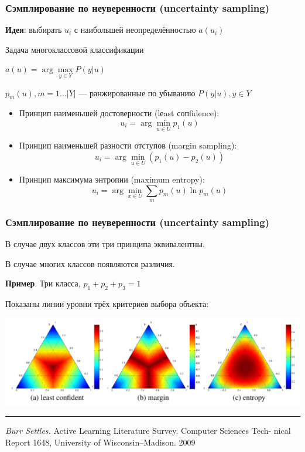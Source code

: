 \documentclass[fullscreen=true, bookmarks=true, hyperref={pdfencoding=unicode}]{beamer}
\begin{document}
\begin{frame}
  \frametitle{Сэмплирование по неуверенности (uncertainty sampling)}

  {\bf Идея}: выбирать $u_i$ с наибольшей неопределённостью $a(u_i)$

  \begin{block}{Задача многоклассовой классификации}
    \centerline{$ a(u) = \arg\max\limits_{y\in Y} P(y|u) $}

    {\small $p_m(u), m=1\dots |Y|$ — ранжированные по убыванию $P(y|u), y \in Y$}
  \end{block}

  \begin{itemize}
    \item Принцип наименьшей достоверности (lеast сопfidence):
    $$u_i = \arg\min\limits_{u\in U} p_1(u)$$

    \item Принцип наименьшей разности отступов (margin sampling):
    $$u_i = \arg\min\limits_{u\in U} \left( p_1(u) - p_2(u) \right)$$

    \item Принцип максимума энтропии (maximum entropy):
    $$u_i = \arg\min\limits_{x\in U} \sum\limits_{m} p_m(u) \ln p_m(u)$$

  \end{itemize}

\end{frame}

\begin{frame}
  \frametitle{Сэмплирование по неуверенности (uncertainty sampling)}

  В случае двух классов эти три принципа эквивалентны.

  В случае многих классов появляются различия.

  \vspace{0.5cm}
  {\bf Пример}. Три класса, $p_1 + p_2 + p_3 = 1$

  Показаны линии уровни трёх критериев выбора объекта:

  \begin{center}
    \includegraphics[keepaspectratio,
                     width=.9\paperwidth]{three_uncertaincy_principles.png}
  \end{center}

  \noindent\rule{8cm}{0.4pt}

  {\small
  {\it Burr Settles.} Active Learning Literature Survey. Computer Sciences Tech-
  nical Report 1648, University of Wisconsin–Madison. 2009}

\end{frame}
\end{document}
